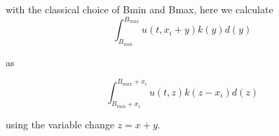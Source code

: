 \documentclass[12pt]{article}
\begin{document}
 
 with the classical choice of Bmin and Bmax, here we calculate
 \begin{equation}
  \int_{B_{min}}^{B_{max}} u(t,x_i+y)k(y)d(y)
 \end{equation}

 as
 
 \begin{equation}
  \int_{B_{min}+x_i}^{B_{max}+x_i} u(t,z)k(z-x_i)d(z)
 \end{equation}

 using the variable change $z=x+y$.
 
 
\end{document}

